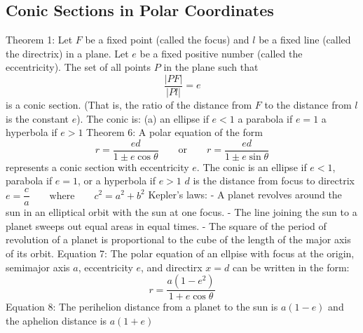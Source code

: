\documentclass{article}
\begin{document}
\begin{multicols}{2}
    \subsection{Conic Sections in Polar Coordinates}
    \begin{outline}
        \1 Theorem 1: Let $F$ be a fixed point (called the focus) and $l$ be a fixed line (called the directrix) in a plane. Let $e$ be a fixed positive number (called the eccentricity). The set of all points $P$ in the plane such that \[\dfrac{|PF|}{|Pl|}=e\] is a conic section. (That is, the ratio of the distance from $F$ to the distance from $l$ is the constant $e$). The conic is: 
            \2 (a) an ellipse if \(e<1\)
            \2 a parabola if \(e=1\)
            \2 a hyperbola if \(e>1\)
        \1 Theorem 6: A polar equation of the form \[r=\dfrac{ed}{1\pm e\cos\theta}\qquad\text{or}\qquad r=\dfrac{ed}{1\pm e\sin\theta}\] represents a conic section with eccentricity $e$. The conic is an ellipse if \(e<1\), parabola if \(e=1\), or a hyperbola if \(e>1\)
            \2 $d$ is the distance from focus to directrix
        \1 \(e=\dfrac{c}{a}\qquad\text{where}\qquad c^2=a^2+b^2\)
        \1 Kepler's laws: 
             - A planet revolves around the sun in an elliptical orbit with the sun at one focus. 
             - The line joining the sun to a planet sweeps out equal areas in equal times. 
             - The square of the period of revolution of a planet is proportional to the cube of the length of the major axis of its orbit. 
        \1 Equation 7: The polar equation of an ellpise with focus at the origin, semimajor axis $a$, eccentricity $e$, and directirx \(x=d\) can be written in the form: \[r=\dfrac{a(1-e^2)}{1+e\cos\theta}\]
        \1 Equation 8: The perihelion distance from a planet to the sun is \(a(1-e)\) and the aphelion distance is \(a(1+e)\)
    \end{outline}
    \end{multicols}
\end{document}
